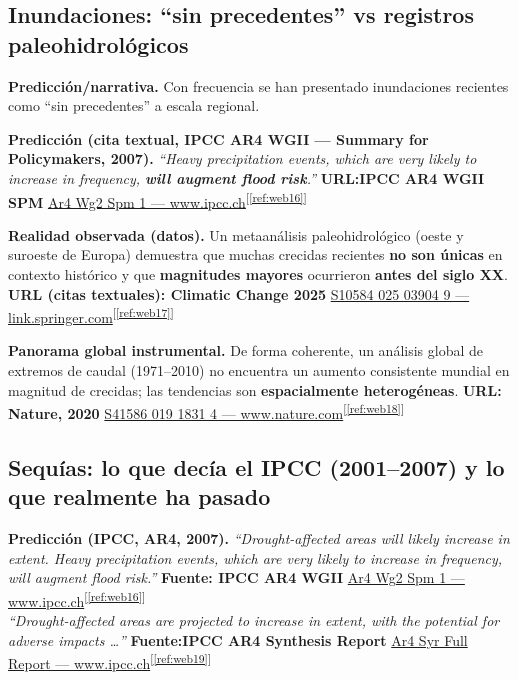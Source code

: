\documentclass[
  10pt,
  a4paper,
  DIV=11,
  numbers=noendperiod,
  open=any]{scrreprt}
\numberwithin{equation}{chapter}
\numberwithin{equation}{section}
\renewcommand{\[}{\begin{equation}}
\renewcommand{\]}{\end{equation}}
\newcommand{\refweb}[3]{%
  \href{#1}{#2}\textsuperscript{[\ref{ref:#3}]}%
}
\begin{document}
\subsection{Inundaciones: “sin precedentes” vs registros paleohidrológicos}

\textbf{Predicción/narrativa.}
Con frecuencia se han presentado inundaciones recientes como “sin precedentes” a escala regional.

\textbf{Predicción (cita textual, IPCC AR4 WGII — Summary for Policymakers, 2007).}
\emph{“Heavy precipitation events, which are very likely to increase in frequency, \textbf{will augment flood risk}.”}
\textbf{URL:IPCC AR4 WGII SPM} \refweb{https://www.ipcc.ch/site/assets/uploads/2018/02/ar4-wg2-spm-1.pdf}{Ar4 Wg2 Spm 1 — www.ipcc.ch}{web16}{}


\textbf{Realidad observada (datos).}
Un metaanálisis paleohidrológico (oeste y suroeste de Europa) demuestra que muchas crecidas recientes \textbf{no son únicas} en contexto histórico y que \textbf{magnitudes mayores} ocurrieron \textbf{antes del siglo XX}.
\textbf{URL (citas textuales): Climatic Change 2025} \refweb{https://link.springer.com/article/10.1007/s10584-025-03904-9}{S10584 025 03904 9 — link.springer.com}{web17}

\textbf{Panorama global instrumental.}
De forma coherente, un análisis global de extremos de caudal (1971–2010) no encuentra un aumento consistente mundial en magnitud de crecidas; las tendencias son \textbf{espacialmente heterogéneas}.
\textbf{URL: Nature, 2020} \refweb{https://www.nature.com/articles/s41586-019-1831-4}{S41586 019 1831 4 — www.nature.com}{web18}


\subsection{Sequías: lo que decía el IPCC (2001--2007) y lo que realmente ha pasado}

\textbf{Predicción (IPCC, AR4, 2007).}
\emph{“Drought-affected areas will likely increase in extent. Heavy precipitation events, which are very likely to increase in frequency, will augment flood risk.”}
\textbf{Fuente: IPCC AR4 WGII} \refweb{https://www.ipcc.ch/site/assets/uploads/2018/02/ar4-wg2-spm-1.pdf}{Ar4 Wg2 Spm 1 — www.ipcc.ch}{web16}\\
\emph{“Drought-affected areas are projected to increase in extent, with the potential for adverse impacts \dots{}”}
\textbf{Fuente:IPCC AR4 Synthesis Report } \refweb{https://www.ipcc.ch/site/assets/uploads/2018/02/ar4_syr_full_report.pdf}{Ar4 Syr Full Report — www.ipcc.ch}{web19}
\end{document}
